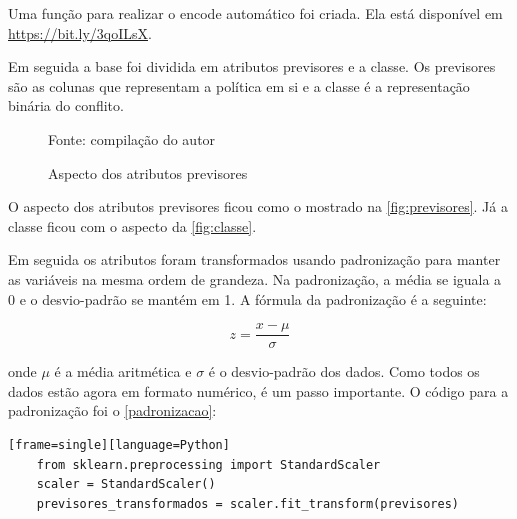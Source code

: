 Uma função para realizar o encode automático foi criada. Ela está disponível em \url{https://bit.ly/3qoILsX}.

Em seguida a base foi dividida em atributos previsores e a classe. Os previsores são as colunas que representam a política em si e a classe é a representação binária do conflito.

\begin{figure}[H]
	\centering
	\caption{Aspecto dos atributos previsores}
	
	\label{fig:previsores}
	{\scriptsize Fonte: compilação do autor}
\end{figure}

O aspecto dos atributos previsores ficou como o mostrado na \autoref{fig:previsores}. Já a classe ficou com o aspecto da \autoref{fig:classe}.

Em seguida os atributos foram transformados usando padronização para manter as variáveis na mesma ordem de grandeza. Na padronização, a média se iguala a 0 e o desvio-padrão se mantém em 1. A fórmula da padronização é a seguinte:

\begin{equation}\label{eq:padronizacao}
z = \frac{x - \mu}{\sigma}
\end{equation}

onde $\mu$ é a média aritmética e $\sigma$ é o desvio-padrão dos dados. Como todos os dados estão agora em formato numérico, é um passo importante. O código para a padronização foi o \autoref{padronizacao}:


\begin{lstlisting}[caption={Código da Padronização},label=padronizacao][frame=single][language=Python]
	from sklearn.preprocessing import StandardScaler
	scaler = StandardScaler()
	previsores_transformados = scaler.fit_transform(previsores)
\end{lstlisting}

